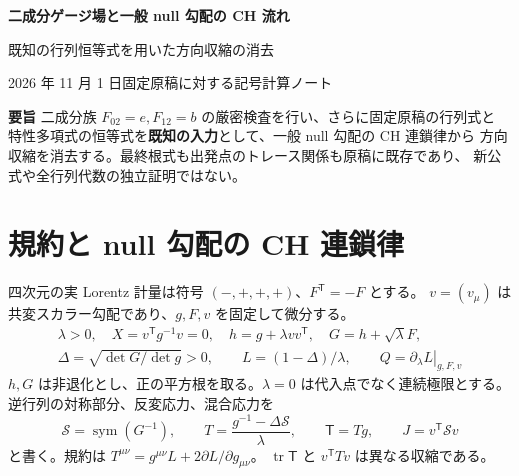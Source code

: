 \documentclass[11pt,a4paper]{article}
\newcommand{\tr}{\operatorname{tr}}
\newcommand{\sym}{\operatorname{sym}}
\newcommand{\Tmix}{\mathsf{T}}
\newcommand{\Sinv}{\mathcal S}
\begin{document}
\begin{center}
{\Large\bfseries 二成分ゲージ場と一般 null 勾配の CH 流れ}\par
\vspace{4pt}
{\large 既知の行列恒等式を用いた方向収縮の消去}\par
\vspace{4pt}
2026 年 11 月 1 日\quad 固定原稿に対する記号計算ノート
\end{center}
\noindent\textbf{要旨}\quad
二成分族 $F_{02}=e,F_{12}=b$ の厳密検査を行い、さらに固定原稿の行列式と
特性多項式の恒等式を\textbf{既知の入力}として、一般 null 勾配の CH 連鎖律から
方向収縮を消去する。最終根式も出発点のトレース関係も原稿に既存であり、
新公式や全行列代数の独立証明ではない。

\section{規約と null 勾配の CH 連鎖律}
四次元の実 Lorentz 計量は符号 $(-,+,+,+)$、$F^{\mathsf T}=-F$ とする。
$v=(v_\mu)$ は共変スカラー勾配であり、$g,F,v$ を固定して微分する。
\begin{equation}\label{eq:def}
\begin{gathered}
\lambda>0,\quad X=v^{\mathsf T}g^{-1}v=0,\quad
h=g+\lambda vv^{\mathsf T},\quad G=h+\sqrt\lambda F,\\
\Delta=\sqrt{\det G/\det g}>0,\qquad
L=(1-\Delta)/\lambda,\qquad Q=\left.\partial_\lambda L\right|_{g,F,v}
\end{gathered}
\end{equation}
$h,G$ は非退化とし、正の平方根を取る。$\lambda=0$ は代入点でなく連続極限とする。
逆行列の対称部分、反変応力、混合応力を
\begin{equation}\label{eq:stress}
\Sinv=\sym(G^{-1}),\qquad
T=\frac{g^{-1}-\Delta\Sinv}{\lambda},\qquad \Tmix=Tg,\qquad J=v^{\mathsf T}\Sinv v
\end{equation}
と書く。規約は $T^{\mu\nu}=g^{\mu\nu}L+2\partial L/\partial g_{\mu\nu}$。
$\tr\Tmix$ と $v^{\mathsf T}Tv$ は異なる収縮である。
\end{document}
